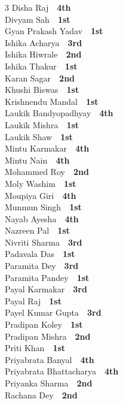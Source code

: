 \documentclass[11pt,a4paper]{article}
\begin{document}
\begin{multicols}{3}
Disha Raj~\dotfill~\textbf{4th}\\
Divyam Sah~\dotfill~\textbf{1st}\\
Gyan Prakash Yadav~\dotfill~\textbf{1st}\\
Ishika Acharya~\dotfill~\textbf{3rd}\\
Ishika Hiwrale~\dotfill~\textbf{2nd}\\
Ishika Thakur~\dotfill~\textbf{1st}\\
Karan Sagar~\dotfill~\textbf{2nd}\\
Khushi Biswas~\dotfill~\textbf{1st}\\
Krishnendu Mandal~\dotfill~\textbf{1st}\\
Laukik Bandyopadhyay~\dotfill~\textbf{4th}\\
Laukik Mishra~\dotfill~\textbf{1st}\\
Laukik Shaw~\dotfill~\textbf{1st}\\
Mintu Karmakar~\dotfill~\textbf{4th}\\
Mintu Nain~\dotfill~\textbf{4th}\\
Mohammed Roy~\dotfill~\textbf{2nd}\\
Moly Washim~\dotfill~\textbf{1st}\\
Moupiya Giri~\dotfill~\textbf{4th}\\
Munmun Singh~\dotfill~\textbf{1st}\\
Nayab Ayesha~\dotfill~\textbf{4th}\\
Nazreen Pal~\dotfill~\textbf{1st}\\
Nivriti Sharma~\dotfill~\textbf{3rd}\\
Padavala Das~\dotfill~\textbf{1st}\\
Paramita Dey~\dotfill~\textbf{3rd}\\
Paramita Pandey~\dotfill~\textbf{1st}\\
Payal Karmakar~\dotfill~\textbf{3rd}\\
Payal Raj~\dotfill~\textbf{1st}\\
Payel Kumar Gupta~\dotfill~\textbf{3rd}\\
Pradipan Koley~\dotfill~\textbf{1st}\\
Pradipan Mishra~\dotfill~\textbf{2nd}\\
Priti Khan~\dotfill~\textbf{1st}\\
Priyabrata Banyal~\dotfill~\textbf{4th}\\
Priyabrata Bhattacharya~\dotfill~\textbf{4th}\\
Priyanka Sharma~\dotfill~\textbf{2nd}\\
Rachana Dey~\dotfill~\textbf{2nd}\\

\end{multicols}
\end{document}
